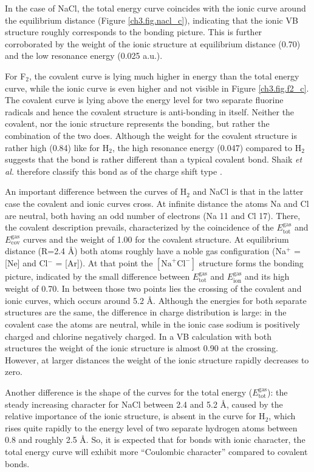 In the case of NaCl, the total energy curve coincides with the ionic curve around the equilibrium distance (Figure \ref{ch3.fig.nacl_c}), indicating that the ionic VB structure roughly corresponds to the bonding picture. This is further corroborated by the weight of the ionic structure at equilibrium distance (0.70) and the low resonance energy (0.025 a.u.).

For F$_2$, the covalent curve is lying much higher in energy than the total energy curve, while the ionic curve is even higher and not visible in Figure \ref{ch3.fig.f2_c}. The covalent curve is lying above the energy level for two separate fluorine radicals and hence the covalent structure is anti-bonding in itself. Neither the covalent, nor the ionic structure represents the bonding, but rather the combination of the two does. Although the weight for the covalent structure is rather high (0.84) like for H$_2$, the high resonance energy (0.047) compared to H$_2$ suggests that the bond is rather different than a typical covalent bond. Shaik \textit{et al.} therefore classify this bond as of the charge shift type \cite{cs1,cs2}.

An important difference between the curves of H$_2$ and NaCl is that in the latter case the covalent and ionic curves cross. At infinite distance the atoms Na and Cl are neutral, both having an odd number of electrons (Na 11 and Cl 17). There, the covalent description prevails, characterized by the coincidence of the $E_\mathrm{tot}^\mathrm{gas}$ and $E_\mathrm{cov}^\mathrm{gas}$ curves and the weight of 1.00 for the covalent structure. At equilibrium distance (R=2.4 \AA) both atoms roughly have a noble gas configuration (Na$^{+}$ = [Ne] and Cl$^{-}$ = [Ar]). At that point the $[\mathrm{Na}^{+}\mathrm{Cl}^{-}]$ structure forms the bonding picture, indicated by the small difference between $E_\mathrm{tot}^\mathrm{gas}$ and $E_\mathrm{ion}^\mathrm{gas}$ and its high weight of 0.70. In between those two points lies the crossing of the covalent and ionic curves, which occurs around 5.2 \AA. Although the energies for both separate structures are the same, the difference in charge distribution is large: in the covalent case the atoms are neutral, while in the ionic case sodium is positively charged and chlorine negatively charged. In a VB calculation with both structures the weight of the ionic structure is almost 0.90 at the crossing. However, at larger distances the weight of the ionic structure rapidly decreases to zero.

Another difference is the shape of the curves for the total energy ($E_\mathrm{tot}^\mathrm{gas}$): the steady increasing character for NaCl between 2.4 and 5.2 \AA, caused by the relative importance of the ionic structure, is absent in the curve for H$_2$, which rises quite rapidly to the energy level of two separate hydrogen atoms between 0.8 and roughly 2.5 \AA. So, it is expected that for bonds with ionic character, the total energy curve will exhibit more ``Coulombic character'' compared to covalent bonds. 


